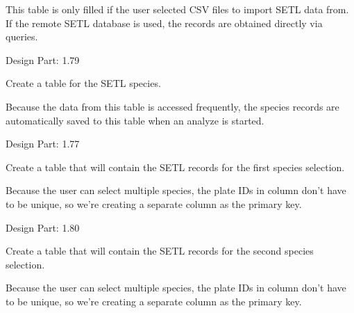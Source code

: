 \documentclass[letterpaper,10pt,english]{sphinxmanual}
\begin{document}
\begin{fulllineitems}
\begin{fulllineitems}
This table is only filled if the user selected CSV files to
import SETL data from. If the remote SETL database is used,
the records are obtained directly via queries.

Design Part: 1.79

\end{fulllineitems}


\begin{fulllineitems}
\label{setlyze/database:setlyze.database.MakeLocalDB.create_table_species}
Create a table for the SETL species.

Because the data from this table is accessed frequently, the
species records are automatically saved to this table when
an analyze is started.

Design Part: 1.77

\end{fulllineitems}


\begin{fulllineitems}
\label{setlyze/database:setlyze.database.MakeLocalDB.create_table_species_spots_1}
Create a table that will contain the SETL records for the
first species selection.

Because the user can select multiple species, the plate IDs in
column  don't have to be unique, so we're
creating a separate column  as the primary key.

Design Part: 1.80

\end{fulllineitems}


\begin{fulllineitems}
\label{setlyze/database:setlyze.database.MakeLocalDB.create_table_species_spots_2}
Create a table that will contain the SETL records for the
second species selection.

Because the user can select multiple species, the plate IDs in
column  don't have to be unique, so we're
creating a separate column  as the primary key.


\end{fulllineitems}
\end{fulllineitems}
\end{document}
